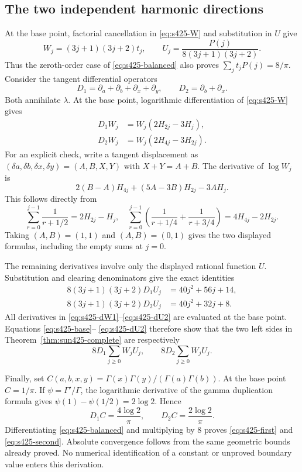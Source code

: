 \documentclass[11pt,a4paper]{article}
\theoremstyle{remark}\newtheorem{remark}[theorem]{Remark}
\numberwithin{equation}{section}
\begin{document}
\subsection{The two independent harmonic directions}
At the base point, factorial cancellation in \eqref{eq:s425-W} and
substitution in $U$ give
\begin{equation}\label{eq:s425-base}
 W_j=(3j+1)(3j+2)t_j,
 \qquad
 U_j=\frac{P(j)}{8(3j+1)(3j+2)}.
\end{equation}
Thus the zeroth-order case of \eqref{eq:s425-balanced} also proves
$\sum_j t_jP(j)=8/\pi$.
Consider the tangent differential operators
\[
 D_1=\partial_a+\partial_b+\partial_x+\partial_y,
 \qquad D_2=\partial_b+\partial_x.
\]
Both annihilate $\lambda$. At the base point, logarithmic
differentiation of \eqref{eq:s425-W} gives
\begin{align}
 D_1W_j&=W_j(2H_{2j}-3H_j),\label{eq:s425-dW1}\\
 D_2W_j&=W_j(2H_{4j}-3H_{2j}).\label{eq:s425-dW2}
\end{align}
For an explicit check, write a tangent displacement as
$(\delta a,\delta b,\delta x,\delta y)=(A,B,X,Y)$ with
$X+Y=A+B$. The derivative of $\log W_j$ is
\[
 2(B-A)H_{4j}+(5A-3B)H_{2j}-3AH_j.
\]
This follows directly from
\[
 \sum_{r=0}^{j-1}\frac1{r+1/2}=2H_{2j}-H_j,
 \quad
 \sum_{r=0}^{j-1}\left(\frac1{r+1/4}+\frac1{r+3/4}\right)
 =4H_{4j}-2H_{2j}.
\]
Taking $(A,B)=(1,1)$ and $(A,B)=(0,1)$ gives the two displayed
formulas, including the empty sums at $j=0$.

The remaining derivatives involve only the displayed rational function
$U$. Substitution and clearing denominators give the exact identities
\begin{align}
 8(3j+1)(3j+2)D_1U_j&=40j^2+56j+14,
 \label{eq:s425-dU1}\\
 8(3j+1)(3j+2)D_2U_j&=40j^2+32j+8.
 \label{eq:s425-dU2}
\end{align}
All derivatives in \eqref{eq:s425-dW1}--\eqref{eq:s425-dU2} are
evaluated at the base point. Equations \eqref{eq:s425-base}--
\eqref{eq:s425-dU2} therefore show that the two left sides in
Theorem~\ref{thm:sun425-complete} are respectively
\[
 8D_1\sum_{j\ge0}W_jU_j,
 \qquad 8D_2\sum_{j\ge0}W_jU_j.
\]

Finally, set $C(a,b,x,y)=\Gamma(x)\Gamma(y)/(\Gamma(a)\Gamma(b))$.
At the base point $C=1/\pi$. If $\psi=\Gamma'/\Gamma$, the
logarithmic derivative of the gamma duplication formula gives
$\psi(1)-\psi(1/2)=2\log2$. Hence
\[
 D_1C=\frac{4\log2}{\pi},\qquad
 D_2C=\frac{2\log2}{\pi}.
\]
Differentiating \eqref{eq:s425-balanced} and multiplying by $8$
proves \eqref{eq:s425-first} and \eqref{eq:s425-second}.
Absolute convergence follows from the same geometric bounds already
proved. No numerical identification of a constant or unproved boundary
value enters this derivation.
\end{document}
